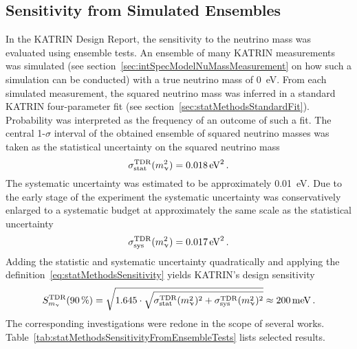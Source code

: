 \subsection{Sensitivity from Simulated Ensembles}
\label{sec:statMethodsSensitivtyFromEnsemble}
In the KATRIN Design Report, the sensitivity to the neutrino mass was evaluated using ensemble tests. An ensemble of many KATRIN measurements was simulated (see section~\ref{sec:intSpecModelNuMassMeasurement} on how such a simulation can be conducted) with a true neutrino mass of \SI{0}{eV}. From each simulated measurement, the squared neutrino mass was inferred in a standard KATRIN four-parameter fit (see section~\ref{sec:statMethodsStandardFit}). Probability was interpreted as the frequency of an outcome of such a fit. The central 1-$\sigma$ interval of the obtained ensemble of squared neutrino masses was taken as the statistical uncertainty on the squared neutrino mass~\cite{Angrik:2005ep}
\begin{equation}
	\sigma_\mathrm{stat}^\mathrm{TDR}(m_\upnu^2) = \SI{0.018}{eV^2}
	\text{\,.}
\end{equation}
The systematic uncertainty was estimated to be approximately \SI{0.01}{eV}. Due to the early stage of the experiment the systematic uncertainty was conservatively enlarged to a systematic budget at approximately the same scale as the statistical uncertainty~\cite{Angrik:2005ep}
\begin{equation}
	\sigma_\mathrm{sys}^\mathrm{TDR}(m_\upnu^2) = \SI{0.017}{eV^2}
	\text{\,.}
\end{equation}
Adding the statistic and systematic uncertainty quadratically and applying the definition~\eqref{eq:statMethodsSensitivity} yields KATRIN's design sensitivity~\cite{Angrik:2005ep}
\begin{equation}
	\label{eq:statMethodsSensitivityDesignReport}
	S_{m_\upnu}^{\mathrm{TDR}}(\SI{90}{\percent}) = 
	\sqrt{1.645\cdot
		\sqrt{
		\sigma_\mathrm{stat}^\mathrm{TDR}(m_\upnu^2)^2+\sigma_\mathrm{sys}^\mathrm{TDR}(m_\upnu^2)^2
	}}
	\approx \SI{200}{meV}
	\text{\,.}
\end{equation}
The corresponding investigations were redone in the scope of several works. Table~\ref{tab:statMethodsSensitivityFromEnsembleTests} lists selected results.

